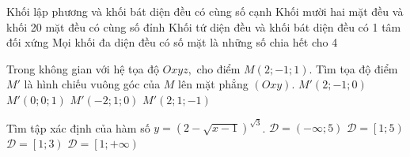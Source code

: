 \begin{ex}
\choice
{\True Khối lập phương và khối bát diện đều có cùng số cạnh}
{Khối mười hai mặt đều và khối 20 mặt đều có cùng số đỉnh}
{Khối tứ diện đều và khối bát diện đều có 1 tâm đối xứng}
{Mọi khối đa diện đều có số mặt là những số chia hết cho 4}
\end{ex}


\begin{ex} %
Trong không gian với hệ tọa độ $Oxyz,$ cho điểm $M\left(2; -1; 1\right)$. Tìm tọa độ điểm $M'$ là hình chiếu vuông góc của $M$ lên mặt phẳng $\left(Oxy\right)$.
\choice
{\True $M' \left(2; -1; 0\right)$}
{$M' \left(0; 0; 1\right)$}
{$M' \left(-2; 1; 0\right)$}
{$M' \left(2; 1; -1\right)$}
\end{ex}




\begin{ex}%
Tìm tập xác định của hàm số $y = \left(2 - \sqrt{x - 1}\right)^{\sqrt{3}}$.
\choice
{$\mathcal{D} = \left(-\infty; 5\right)$}
{\True $\mathcal{D} = \left[1; 5\right)$}
{$\mathcal{D} = \left[1; 3\right)$}
{$\mathcal{D} = \left[1; +\infty\right)$}
\end{ex}



